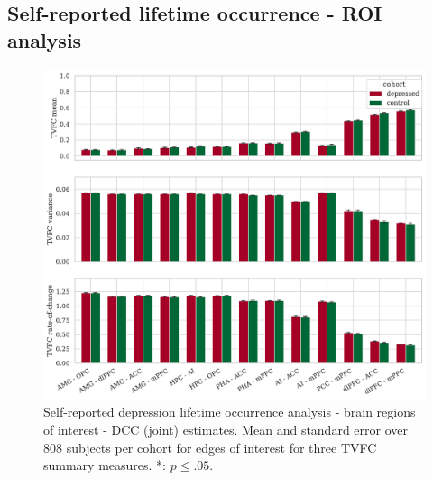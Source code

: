 


\clearpage
\subsection{Self-reported lifetime occurrence - ROI analysis}


\begin{figure}[h]
    \centering
    \includegraphics[width=\textwidth]{fig/ukbiobank/TVFC_predictions_summaries/lifetime_occurrence/cohort_comparison/ROI/correlation_all_TVFC_summary_measures_DCC_joint_edges_of_interest}
    \caption{
        Self-reported depression lifetime occurrence analysis - brain regions of interest - DCC (joint) estimates.
        Mean and standard error over 808 subjects per cohort for edges of interest for three TVFC summary measures.
        *: $p \leq .05$.
    }\label{fig:ukb-results-lo-roi-cohort-comparison-edges-of-interest-dcc-j}
\end{figure}


